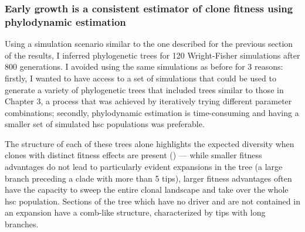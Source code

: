 \subsubsection{Early growth is a consistent estimator of clone fitness using phylodynamic estimation}

Using a simulation scenario similar to the one described for the previous section of the results, I inferred phylogenetic trees for 120 Wright-Fisher simulations after 800 generations. I avoided using the same simulations as before for 3 reasons: firstly, I wanted to have access to a set of simulations that could be used to generate a variety of phylogenetic trees that included trees similar to those in Chapter 3, a process that was achieved by iteratively trying different parameter combinations; secondly, phylodynamic estimation is time-consuming and having a smaller set of simulated \ac{hsc} populations was preferable.

The structure of each of these trees alone highlights the expected diversity when clones with distinct fitness effects are present () --- while smaller fitness advantages do not lead to particularly evident expansions in the tree (a large branch preceding a clade with more than 5 tips), larger fitness advantages often have the capacity to sweep the entire clonal landscape and take over the whole \ac{hsc} population. Sections of the tree which have no driver and are not contained in an expansion have a comb-like structure, characterized by tips with long branches.

\begin{figure}[!ht]
	\label{fig:trees-simulated-examples}
\end{figure}


